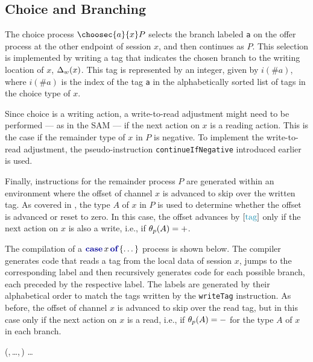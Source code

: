 \subsection{Choice and Branching}

The choice process $\choosec{a}{x}P$ selects the branch labeled \texttt{a} on the offer process at the other endpoint of session $x$, and then continues as $P$. This selection is implemented by writing a tag that indicates the chosen branch to the writing location of $x$, $\Delta_w(x)$. This tag is represented by an integer, given by $i(\#a)$, where $i(\#a)$ is the index of the tag \texttt{a} in the alphabetically sorted list of tags in the choice type of $x$.

Since choice is a writing action, a write-to-read adjustment might need to be performed --- as in the \ac{SAM} --- if the next action on $x$ is a reading action. This is the case if the remainder type of $x$ in $P$ is negative. To implement the write-to-read adjustment, the pseudo-instruction \texttt{continueIfNegative} introduced earlier is used.

Finally, instructions for the remainder process $P$ are generated within an environment where the offset of channel $x$ is advanced to skip over the written tag. As covered in , the type $A$ of $x$ in $P$ is used to determine whether the offset is advanced or reset to zero. In this case, the offset advances by $\seqst{\tags}$ only if the next action on $x$ is also a write, i.e., if $\theta_{p}(A) = +$.
\begin{compilation}{\theta}{\Delta}{}
{}
     
\end{compilation}

The compilation of a $\casec{x}{\dots}$ process is shown below. The compiler generates code that reads a tag from the local data of session $x$, jumps to the corresponding label and then recursively generates code for each possible branch, each preceded by the respective label. The labels are generated by their alphabetical order to match the tags written by the \texttt{writeTag} instruction. As before, the offset of channel $x$ is advanced to skip over the read tag, but in this case only if the next action on $x$ is a read, i.e., if $\theta_{p}(A) = -$ for the type $A$ of $x$ in each branch.
\begin{compilation}{\theta}{\Delta}{}
    {\max(,\,\dots,\,)}
     
    \beginir\dots
     
\end{compilation}

